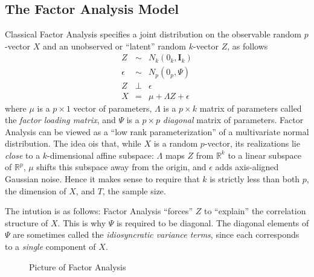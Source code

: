 \documentclass[12pt]{article}
\theoremstyle{definition}
\begin{document}
\subsection{The Factor Analysis Model}
Classical Factor Analysis specifies a joint distribution on the observable random $p$-vector $X$ and an unobserved or ``latent'' random $k$-vector $Z$, as follows
	\begin{eqnarray*}
		Z &\sim& N_k(0_k, \mathbf{I}_k)\\
		\epsilon &\sim& N_p(0_p, \Psi)\\
		Z &\perp& \epsilon\\
		X &=& \mu + \Lambda Z + \epsilon
	\end{eqnarray*}
where $\mu$ is a $p\times 1$ vector of parameters, $\Lambda$ is a $p\times k$ matrix of parameters called the \emph{factor loading matrix}, and $\Psi$ is a $p\times p$ \emph{diagonal} matrix of parameters. Factor Analysis can be viewed as a ``low rank parameterization'' of a multivariate normal distribution. The idea ois that, while $X$ is a random $p$-vector, its realizations lie \emph{close} to a $k$-dimensional affine subspace: $\Lambda$ maps $Z$ from $\mathbb{R}^k$ to a linear subspace of $\mathbb{R}^p$, $\mu$ shifts this subspace away from the origin, and $\epsilon$ adds axis-aligned Gaussian noise. Hence it makes sense to require that $k$ is strictly less than both $p$, the dimension of $X$, and $T$, the sample size. 

The intution is as follows: Factor Analysis ``forces'' $Z$ to ``explain'' the correlation structure of $X$. This is why $\Psi$ is required to be diagonal. The diagonal elements of $\Psi$ are sometimes called the \emph{idiosyncratic variance terms}, since each corresponds to a \emph{single} component of $X$. 
\begin{figure}
	\caption{Picture of Factor Analysis}
\end{figure}
\end{document}
